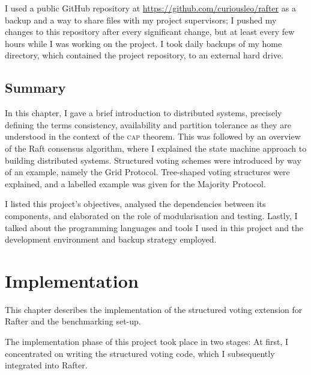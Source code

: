 \documentclass[12pt,chapterprefix=true,toc=bibliography,numbers=noendperiod,
               footnotes=multiple,twoside]{scrreprt}
\begin{document}
I used a public GitHub repository at \url{https://github.com/curiousleo/rafter} as a backup and a way to share files with my project supervisors; I pushed my changes to this repository after every significant change, but at least every few hours while I was working on the project. I took daily backups of my home directory, which contained the project repository, to an external hard drive.

\section{Summary}

In this chapter, I gave a brief introduction to distributed systems, precisely defining the terms consistency, availability and partition tolerance as they are understood in the context of the \textsc{cap} theorem. This was followed by an overview of the Raft consensus algorithm, where I explained the state machine approach to building distributed systems. Structured voting schemes were introduced by way of an example, namely the Grid Protocol. Tree-shaped voting structures were explained, and a labelled example was given for the Majority Protocol.

I listed this project's objectives, analysed the dependencies between its components, and elaborated on the role of modularisation and testing. Lastly, I talked about the programming languages and tools I used in this project and the development environment and backup strategy employed.



\chapter{Implementation}
\label{ch:implementation}


This chapter describes the implementation of the structured voting extension for Rafter and the benchmarking set-up.

The implementation phase of this project took place in two stages: At first, I concentrated on writing the structured voting code, which I subsequently integrated into Rafter.
\end{document}
